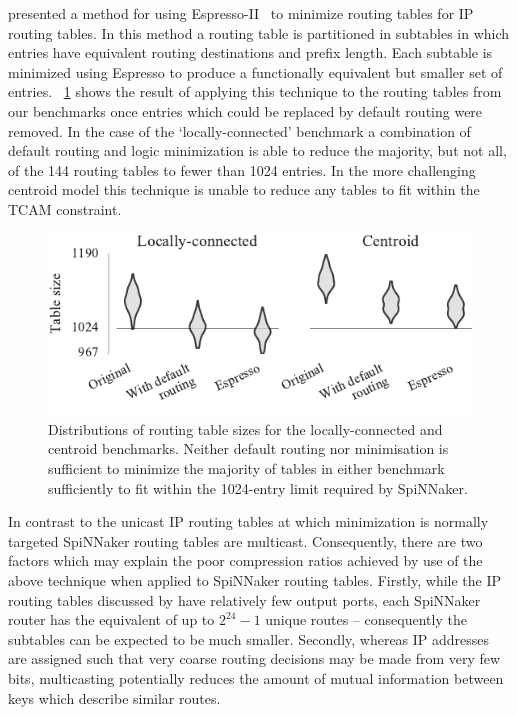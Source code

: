 \documentclass[conference]{IEEEtran}
\begin{document}
\textcite{Liu2002} presented a method for using Espresso-II~\parencite{Brayton1984} to minimize routing tables for IP routing tables.
In this method a routing table is partitioned in subtables in which entries have equivalent routing destinations and prefix length.
Each subtable is minimized using Espresso to produce a functionally equivalent but smaller set of entries.
\figurename~\ref{fig:results/espresso_no_dc} shows the result of applying this technique to the routing tables from our benchmarks once entries which could be replaced by default routing were removed.
In the case of the `locally-connected' benchmark a combination of default routing and logic minimization is able to reduce the majority, but not all, of the 144 routing tables to fewer than 1024 entries.
In the more challenging centroid model this technique is unable to reduce any tables to fit within the TCAM constraint.

\begin{figure}
  \centering
  \includegraphics{experiments/results_no_dc}
  \caption{
    Distributions of routing table sizes for the locally-connected and centroid benchmarks.
    Neither default routing nor minimisation is sufficient to minimize the majority of tables in either benchmark sufficiently to fit within the 1024-entry limit required by SpiNNaker.}
  \label{fig:results/espresso_no_dc}
\end{figure}

In contrast to the unicast IP routing tables at which minimization is normally targeted SpiNNaker routing tables are multicast.
Consequently, there are two factors which may explain the poor compression ratios achieved by use of the above technique when applied to SpiNNaker routing tables.
Firstly, while the IP routing tables discussed by \textcite{Liu2002} have relatively few output ports, each SpiNNaker router has the equivalent of up to $2^{24} - 1$ unique routes -- consequently the subtables can be expected to be much smaller.
Secondly, whereas IP addresses are assigned such that very coarse routing decisions may be made from very few bits, multicasting potentially reduces the amount of mutual information between keys which describe similar routes.
\end{document}
